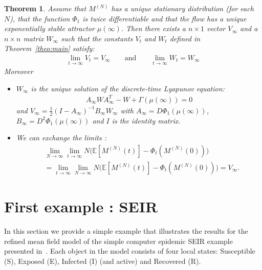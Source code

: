 \documentclass{sig-alternate-per}
\newtheorem{theorem}{Theorem}
\newcommand\MN{M^{(N)}}
\newcommand{\aN}{^{(N)}}
\begin{document}
\begin{theorem}\label{theo:steady}
  Assume that $\MN$ has a unique stationary distribution (for each
  $N$), that the function $\Phi_1$ is twice differentiable and that
  the flow has a unique exponentially stable attractor
  $\mu(\infty)$. Then there exists a $n\times1$ vector $V_{\infty}$ and
  a $n\times n$ matrix $W_{\infty}$ such that the constants $V_t$ and
  $W_t$ defined in Theorem~\ref{theo:main} satisfy:
  \begin{align*}
    \lim_{t\to\infty}V_t=V_{\infty} \qquad \mathrm{and}\qquad
    \lim_{t\to\infty}W_t=W_{\infty}
  \end{align*}
  Moreover
  \begin{itemize}[leftmargin=*]
  \item[(i)]$W_\infty$ is the unique solution of the discrete-time
    Lyapunov equation:
    \begin{align*}
      A_\infty WA_\infty^T - W + \Gamma(\mu(\infty)) = 0
    \end{align*}
    and $V_{\infty}=\frac12(I-A_\infty)^{-1}B_\infty W_\infty$ with
    $A_\infty=D\Phi_1(\mu(\infty))$, $B_\infty=D^2\Phi_1(\mu(\infty))$
    and $I$ is the identity matrix.
  \item[(ii)] We can exchange the limits :
    \begin{align*}
      &\lim_{N\to\infty}\lim_{t\to\infty}
        N\big(\mathbb{E}[\MN(t)]- \Phi_t(M\aN(0))\big)\\
      &=\lim_{t\to\infty}\lim_{N\rightarrow \infty}
        N\big(\mathbb{E}[\MN(t)]- \Phi_t({M}\aN(0))\big)
        = V_\infty. 
    \end{align*}
  \end{itemize}

\end{theorem}


\section{First example : SEIR}
\label{sect:RefSEIR}
In this section we provide a simple example that illustrates the
results for the refined mean field model of the simple computer
epidemic SEIR example presented in~\cite{BHLM13}.  Each object in the
model consists of four local states: Susceptible (S), Exposed (E),
Infected (I) (and active) and Recovered (R). 
\end{document}
